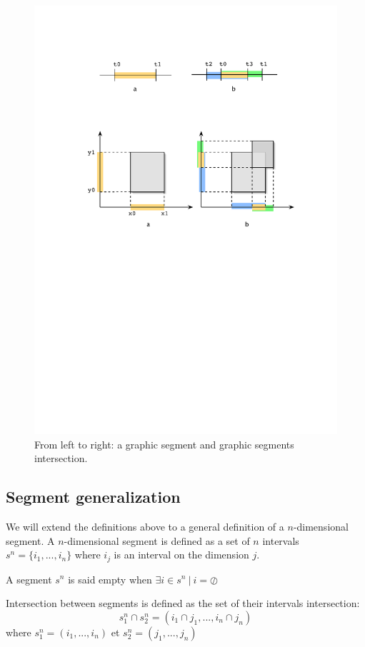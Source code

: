 \documentclass{article}
\newcommand{\emptyseg}		{\ensuremath{\oslash}}
\begin{document}
\vspace{-4mm}
\begin{figure}[htbp]
\centerline{
	\includegraphics[width=0.8\columnwidth]{imgs/segments2D}}
\caption{From left to right: a graphic segment and graphic segments intersection.}
\label{fig:gsegment}
\end{figure}


\subsection{Segment generalization}\label{subsec:generalseg}
We will extend the definitions above to a general definition of a $n$-dimensional segment.
A $n$-dimensional segment is defined as a set of $n$ intervals $s^n=\{i_1,...,i_n\}$ where $i_j$ is an interval on the dimension $j$.

A segment $s^n$ is said empty when $\exists i \in s^n\ |\ i = \emptyseg $

Intersection between segments is defined as the set of their intervals intersection:
\begin{equation}
s_1^n \cap s_2^n = (i_1 \cap j_1, ... , i_n \cap j_n)
\end{equation}
where $s_1^n = (i_1, ... , i_n)$ et  $s_2^n = (j_1, ... , j_n)$
\end{document}
